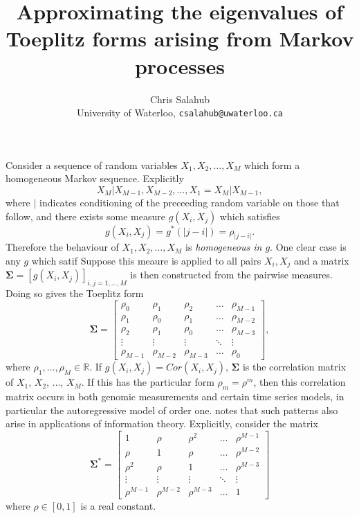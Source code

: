 \documentclass[letterpaper,12pt,oneside,final]{article}
\title{Approximating the eigenvalues of Toeplitz forms arising from Markov processes}
\author{Chris Salahub \\ {\footnotesize University of Waterloo, \texttt{csalahub@uwaterloo.ca}}}
\newcommand{\sm}[1]{\boldsymbol{#1}}   %
\newcommand{\abs}[1]{\lvert{#1}\rvert}              %
\newcommand{\field}[1]{\mathbb{#1}}
\newcommand{\Reals}{\field{R}}
\begin{document}
\maketitle

Consider a sequence of random variables $X_1, X_2, \dots, X_M$ which form a homogeneous Markov sequence. Explicitly
$$X_M | X_{M-1}, X_{M-2}, \dots, X_1 = X_M | X_{M-1},$$
where $|$ indicates conditioning of the preceeding random variable on those that follow, and there exists some measure $g(X_i, X_j)$ which satisfies
$$g(X_i, X_j) = g^*(\abs{j - i}) = \rho_{\abs{j-i}}.$$
Therefore the behaviour of $X_1, X_2, \dots, X_M$ is \emph{homogeneous in $g$}. One clear case is any $g$ which satif Suppose this meaure is applied to all pairs $X_i, X_j$ and a matrix $\sm{\Sigma} = [g(X_i, X_j)]_{i,j=1,\dots,M}$ is then constructed from the pairwise measures. Doing so gives the Toeplitz form
\begin{equation} \label{eq:multipleTesting:genEigCov}
  \sm{\Sigma} = \begin{bmatrix}
    \rho_0 & \rho_1 & \rho_2 & \dots & \rho_{M-1} \\
    \rho_1 & \rho_0 & \rho_1 & \dots & \rho_{M-2} \\
    \rho_2 & \rho_1 & \rho_0 & \dots & \rho_{M-3} \\
    \vdots & \vdots & \vdots & \ddots & \vdots \\
    \rho_{M-1} & \rho_{M-2} & \rho_{M-3} & \dots & \rho_0
  \end{bmatrix},
\end{equation}
where $\rho_1, \dots, \rho_M \in \Reals$. If $g(X_i, X_j) = Cor(X_i, X_j)$, $\sm{\Sigma}$ is the correlation matrix of $X_1$, $X_2$, $\dots$, $X_M$. If this has the particular form $\rho_m = \rho^m$, then this correlation matrix occurs in both genomic measurements and certain time series models, in particular the autoregressive model of order one. \cite{gray2006toeplitz} notes that such patterns also arise in applications of information theory. Explicitly, consider the matrix
\begin{equation} \label{eq:multipleTesting:specEigCov}
  \sm{\Sigma}^* = \begin{bmatrix}
    1 & \rho & \rho^2 & \dots & \rho^{M-1} \\
    \rho & 1 & \rho & \dots & \rho^{M-2} \\
    \rho^2 & \rho & 1 & \dots & \rho^{M-3} \\
    \vdots & \vdots & \vdots & \ddots & \vdots \\
    \rho^{M-1} & \rho^{M-2} & \rho^{M-3} & \dots & 1
  \end{bmatrix}
\end{equation}
where $\rho \in [0, 1]$ is a real constant.
\end{document}
